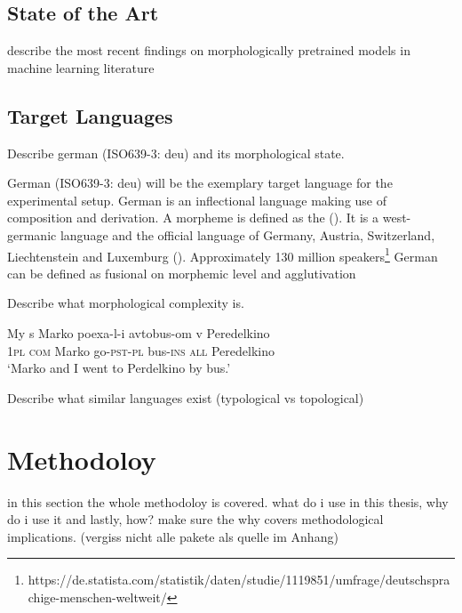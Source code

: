 \documentclass[english]{ttlab-qualify}
\begin{document}
    \section{State of the Art}
    \label{sec:state-of-the-art}
    describe the most recent findings on morphologically pretrained models in machine learning literature

    \section{Target Languages}
    \label{sec:target-languages}
    Describe german (ISO639-3: deu) and its morphological state.

    German (ISO639-3: deu) will be the exemplary target language for the experimental setup.
    German is an inflectional language making use of composition and derivation.
    A morpheme is defined as the  (\cite{morpheme}).
    It is a west-germanic language and the official language of Germany, Austria, Switzerland, Liechtenstein and Luxemburg (\cite{METZLER2016}).
    Approximately 130 million speakers\footnote{https://de.statista.com/statistik/daten/studie/1119851/umfrage/deutschsprachige-menschen-weltweit/}
    German can be defined as fusional on morphemic level and agglutivation


    Describe what morphological complexity is.

    \begin{exe}
    \ex
    \gll  My s Marko poexa-l-i avtobus-om v Peredelkino \\
    1\textsc{pl} \textsc{com} Marko go-\textsc{pst}-\textsc{pl} bus-\textsc{ins} \textsc{all} Peredelkino \\
    \glt  `Marko and I went to Perdelkino by bus.'
    \end{exe}



    Describe what similar languages exist (typological vs topological)

    \chapter{Methodoloy}
    \label{ch:methodology}
    in this section the whole methodoloy is covered. what do i use in this thesis, why do i use it and lastly, how?
    make sure the why covers methodological implications. (vergiss nicht alle pakete als quelle im Anhang)
\end{document}
